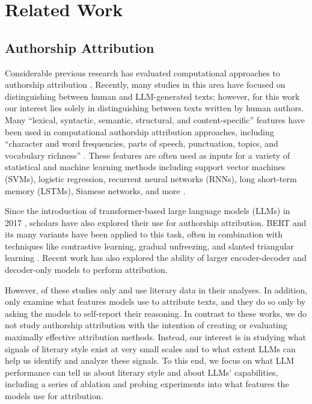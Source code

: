 \section{Related Work}
\subsection{Authorship Attribution}

Considerable previous research has evaluated computational approaches to authorship attribution \citep{huang2024authorship}. Recently, many studies in this area have focused on distinguishing between human and LLM-generated texts; however, for this work our interest lies solely in distinguishing between texts written by human authors. Many ``lexical, syntactic, semantic, structural, and content-specific'' features have been used in computational authorship attribution approaches, including ``character and word frequencies, parts of speech, punctuation, topics, and vocabulary richness'' \citep{huang2024authorship}. These features are often used as inputs for a variety of statistical and machine learning methods including support vector machines (SVMs), logistic regression, recurrent neural networks (RNNs), long short-term memory (LSTMs), Siamese networks, and more \citep{huang2024authorship}. 

Since the introduction of transformer-based large language models (LLMs) in 2017 \citep{vaswani2017attention}, scholars have also explored their use for authorship attribution. BERT and its many variants have been applied to this task, often in combination with techniques like contrastive learning, gradual unfreezing, and slanted triangular learning \citep{huang2024authorship}. Recent work has also explored the ability of larger encoder-decoder \citep{hicke2023t5, najafi2022text} and decoder-only \citep{huang2024alms, huang2024large, adewumi2024limitations, wen2024aidbench} models to perform attribution.

However, of these studies only \citet{hicke2023t5} and \citet{adewumi2024limitations} use literary data in their analyses. In addition, only \citet{huang2024large} examine what features models use to attribute texts, and they do so only by asking the models to self-report their reasoning. In contrast to these works, we do not study authorship attribution with the intention of creating or evaluating maximally effective attribution methods. Instead, our interest is in studying what signals of literary style exist at very small scales and to what extent LLMs can help us identify and analyze these signals. To this end, we focus on what LLM performance can tell us about literary style and about LLMs' capabilities, including a series of ablation and probing experiments into what features the models use for attribution.

